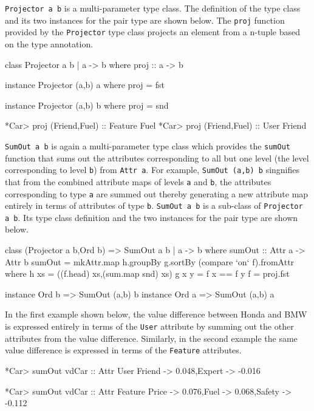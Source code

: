 \documentclass{jfp}
\newcommand{\prog}[1]{\texttt{#1}}
\begin{document}
\prog{Projector a b} is a multi-parameter type class. The definition of the type class and its two instances for the pair type are shown below. The \prog{proj} function provided by the \prog{Projector} type class projects an element from a n-tuple based on the type annotation.
\begin{haskellcode}
class Projector a b | a -> b where
  proj :: a -> b 

instance Projector (a,b) a where
  proj = fst      

instance Projector (a,b) b where
  proj = snd
 
*Car> proj (Friend,Fuel) :: Feature
Fuel
*Car> proj (Friend,Fuel) :: User
Friend
\end{haskellcode}
\prog{SumOut a b} is again a multi-parameter type class which provides the \prog{sumOut} function that sums out the attributes corresponding to all but one level (the level corresponding to level \prog{b}) from \prog{Attr a}. For example, \prog{SumOut (a,b) b} singnifies that from the combined attribute maps of levels \prog{a} and \prog{b}, the attributes corresponding to type \prog{a} are summed out thereby generating a new attribute map entirely in terms of attributes of type \prog{b}. \prog{SumOut a b} is a sub-class of \prog{Projector a b}. Its type class definition and the two instances for the pair type are shown below. 
\begin{haskellcode}
class (Projector a b,Ord b) => SumOut a b | a -> b where
  sumOut :: Attr a -> Attr b 
  sumOut = mkAttr.map h.groupBy g.sortBy (compare `on` f).fromAttr
    where h xs = ((f.head) xs,(sum.map snd) xs)
          g x y = f x == f y
          f = proj.fst

instance Ord b => SumOut (a,b) b 
instance Ord a => SumOut (a,b) a 
\end{haskellcode}
In the first example shown below, the value difference between Honda and BMW is expressed entirely in terms of the \prog{User} attribute by summing out the other attributes from the value difference. Similarly, in the second example the same value difference is expressed in terms of the \prog{Feature} attributes.
\begin{haskellcode}
*Car> sumOut vdCar :: Attr User
{Friend -> 0.048,Expert -> -0.016}
 
*Car> sumOut vdCar :: Attr Feature
{Price -> 0.076,Fuel -> 0.068,Safety -> -0.112}
\end{haskellcode}
\end{document}
